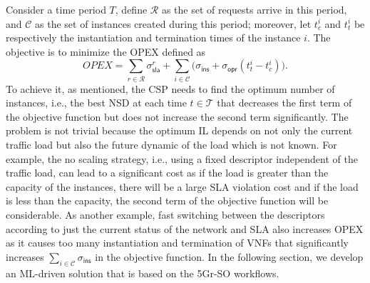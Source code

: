 \documentclass[conference, final]{IEEEtran}
\newcommand{\hlb}[2][blue]{{\color{#1} {#2}}\unskip }
\begin{document}
{Consider a time period $T$, define $\mathcal{R}$ as the set of requests arrive in this period, and $\mathcal{C}$ as the set of instances created during this period; moreover, let $t^{i}_{c}$ and $t^{i}_{t}$ be respectively the instantiation and termination times of the instance $i$. The objective is to minimize the OPEX defined as 
\begin{equation}
OPEX = \sum_{r \in \mathcal{R}} \sigma_{\textsf{sla}}^{r} + \sum_{i \in \mathcal{C}}{\big(\sigma_{\textsf{ins}} + \sigma_{\textsf{opr}}(t^{i}_{t} - t^{i}_{c})\big)}.
\end{equation} 
To achieve it, as mentioned, the CSP needs to find the optimum number of instances, i.e., the best NSD at each time $t \in \mathcal{T}$ that decreases the first term of the objective function but does not increase the second term significantly. The problem is not trivial because the optimum IL depends on not only the current traffic load but also the future dynamic of the load which is not known. For example, the no scaling strategy, i.e., using a fixed descriptor independent of the traffic load, can lead to a significant cost as if the load is greater than the capacity of the instances, there will be a large SLA violation cost and if the load is less than the capacity, the second term of the objective function will be considerable. As another example, fast switching between the descriptors according to just the current status of the network and SLA also increases OPEX as it causes too many instantiation and termination  of VNFs that significantly increases $\sum_{i \in \mathcal{C}}{\sigma_{\textsf{ins}}}$ in the objective function. In the following section, we develop an ML-driven solution that is based on the 5Gr-SO workflows.
  
} %
\end{document}
